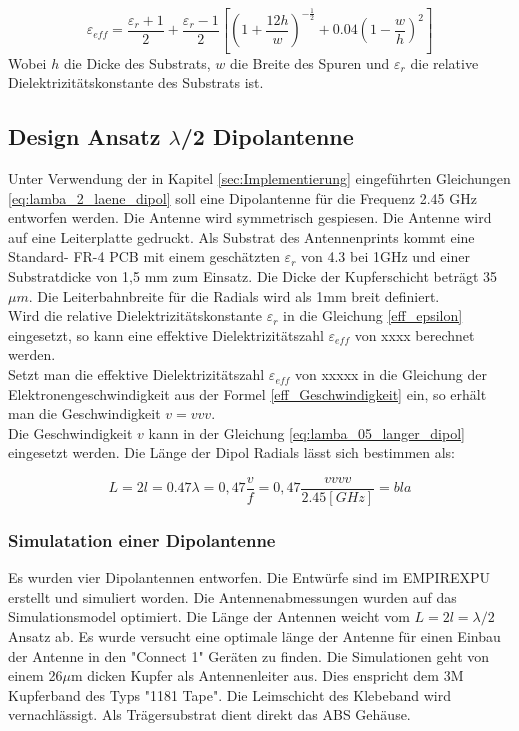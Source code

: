 \begin{equation}\label{eff_epsilon}
\varepsilon_{eff}=\dfrac{\varepsilon_r+1}{2}+\dfrac{\varepsilon_r-1}{2}\left[\left(1+\dfrac{12h}{w}\right)^{-\frac{1}{2}}+0.04\left(1-\dfrac{w}{h}\right)^{2}\right]
\end{equation}
Wobei $h$ die Dicke des Substrats, $w$ die Breite des Spuren und  $\varepsilon_{r}$ die relative Dielektrizitätskonstante des Substrats ist. 

\subsection{Design Ansatz $\lambda$/2 Dipolantenne}  
Unter Verwendung der in Kapitel \ref{sec:Implementierung} eingeführten Gleichungen \ref{eq:lamba_2_laene_dipol} soll eine Dipolantenne für die Frequenz 2.45 GHz entworfen werden. Die Antenne wird symmetrisch gespiesen. Die Antenne wird auf eine Leiterplatte gedruckt. Als Substrat des Antennenprints kommt eine Standard- FR-4 PCB mit einem geschätzten  $\varepsilon_r $ von 4.3 bei 1GHz und einer Substratdicke von 1,5 mm  zum Einsatz. Die Dicke der Kupferschicht beträgt 35 $\mu m$. Die Leiterbahnbreite für die Radials wird als 1mm breit definiert.\\

Wird die relative Dielektrizitätskonstante $\varepsilon_{r}$ in die Gleichung \ref{eff_epsilon} eingesetzt, so kann eine effektive Dielektrizitätszahl $\varepsilon_{eff}$  von xxxx berechnet werden.\\

Setzt man die effektive Dielektrizitätszahl $\varepsilon_{eff}$ von xxxxx  in die Gleichung der Elektronengeschwindigkeit aus der Formel \ref{eff_Geschwindigkeit} ein, so erhält man die Geschwindigkeit $v=vvv$. \\
Die Geschwindigkeit $v$  kann in der  Gleichung \ref{eq:lamba_05_langer_dipol} eingesetzt werden. Die Länge der Dipol Radials lässt sich bestimmen als:

\begin{equation}\label{eq:lamba_05_langer_dipol}
L=2l = 0.47 \lambda= 0,47 \dfrac{v}{f}=0,47 \dfrac{vvvv}{2.45[GHz]}=bla
\end{equation} 
\subsubsection{Simulatation einer Dipolantenne}
Es wurden vier Dipolantennen entworfen. Die Entwürfe sind im EMPIREXPU erstellt und simuliert worden. Die Antennenabmessungen wurden auf das Simulationsmodel optimiert. Die Länge der Antennen weicht vom $L=2l=\lambda/2$ Ansatz ab. Es wurde versucht eine optimale länge der Antenne für einen Einbau der Antenne in den "Connect 1" Geräten zu finden. Die Simulationen geht von einem 26$\mu$m dicken Kupfer als Antennenleiter aus. Dies enspricht dem 3M Kupferband des Typs "1181 Tape". Die Leimschicht des Klebeband wird vernachlässigt. Als Trägersubstrat dient direkt das ABS Gehäuse\cite{Kupferband}.
